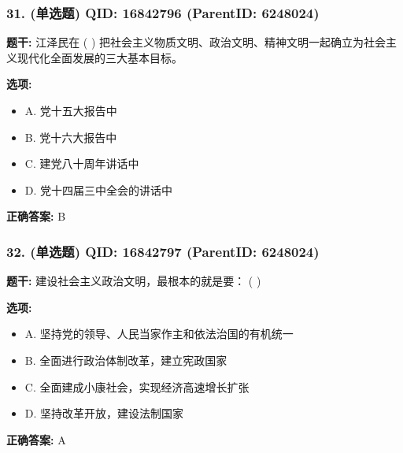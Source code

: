 \documentclass[12pt,UTF8]{ctexart}
\begin{document}
\subsubsection*{31. (单选题) \small QID: 16842796 (ParentID: 6248024)}

\textbf{题干:}
江泽民在 ( ) 把社会主义物质文明、政治文明、精神文明一起确立为社会主义现代化全面发展的三大基本目标。



\textbf{选项:}
\begin{itemize}[leftmargin=*]

  \item A. 党十五大报告中

  \item B. 党十六大报告中

  \item C. 建党八十周年讲话中

  \item D. 党十四届三中全会的讲话中

\end{itemize}

\textbf{正确答案:}
B

\vspace{0.3em}\hrulefill\vspace{0.7em}

\subsubsection*{32. (单选题) \small QID: 16842797 (ParentID: 6248024)}

\textbf{题干:}
建设社会主义政治文明，最根本的就是要： ( )



\textbf{选项:}
\begin{itemize}[leftmargin=*]

  \item A. 坚持党的领导、人民当家作主和依法治国的有机统一

  \item B. 全面进行政治体制改革，建立宪政国家

  \item C. 全面建成小康社会，实现经济高速增长扩张

  \item D. 坚持改革开放，建设法制国家

\end{itemize}

\textbf{正确答案:}
A

\vspace{0.3em}\hrulefill\vspace{0.7em}
\end{document}
